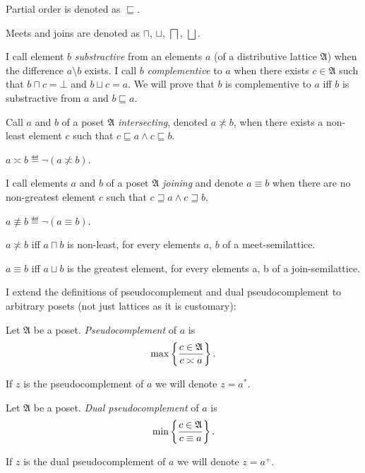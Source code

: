 Partial order is denoted as $\sqsubseteq$.

Meets and joins are denoted as $\sqcap$, $\sqcup$, $\bigsqcap$,
$\bigsqcup$.

I call element $b$ \emph{substractive} from an elements $a$ (of a distributive
lattice $\mathfrak{A}$) when the difference $a\setminus b$ exists.
I call $b$ \emph{complementive} to $a$ when there exists $c\in\mathfrak{A}$
such that $b\sqcap c=\bot$ and $b\sqcup c=a$. We will prove that
$b$ is complementive to $a$ iff $b$ is substractive from $a$ and
$b\sqsubseteq a$.
\begin{defn}
Call $a$ and $b$ of a poset $\mathfrak{A}$ \emph{intersecting},
denoted $a\nasymp b$, when there exists a non-least element $c$
such that $c\sqsubseteq a\land c\sqsubseteq b$.
\end{defn}

\begin{defn}
$a\asymp b\eqdef\lnot(a\nasymp b)$.
\end{defn}

\begin{defn}
I call elements $a$ and $b$ of a poset $\mathfrak{A}$ \emph{joining}
and denote $a\equiv b$ when there are no non-greatest element $c$
such that $c\sqsupseteq a\land c\sqsupseteq b$.
\end{defn}

\begin{defn}
$a\nequiv b\eqdef\lnot(a\equiv b)$.\end{defn}
\begin{obvious}
$a\nasymp b$ iff $a\sqcap b$ is non-least, for every elements $a$,
$b$ of a meet-semilattice.
\end{obvious}

\begin{obvious}
$a\equiv b$ iff $a\sqcup b$ is the greatest element, for every elements
a, b of a join-semilattice.
\end{obvious}
I extend the definitions of pseudocomplement and dual pseudocomplement
to arbitrary posets (not just lattices as it is customary):
\begin{defn}
Let $\mathfrak{A}$ be a poset. \emph{Pseudocomplement} of $a$ is
\[
\max\left\{ \frac{c\in\mathfrak{A}}{c\asymp a}\right\}.
\]


If $z$ is the pseudocomplement of $a$ we will denote $z=a^{\ast}$.
\end{defn}

\begin{defn}
Let $\mathfrak{A}$ be a poset. \emph{Dual pseudocomplement} of $a$
is
\[
\min\left\{ \frac{c\in\mathfrak{A}}{c\equiv a}\right\}.
\]


If $z$ is the dual pseudocomplement of $a$ we will denote $z=a^{+}$.\end{defn}

